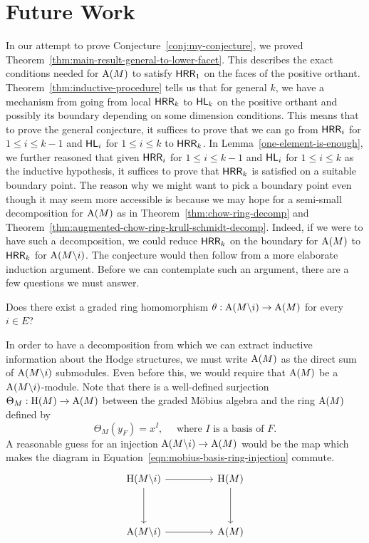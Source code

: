 \documentclass{puthesis-UG}
\begin{document}
\section{Future Work} \label{sec:future-work}

In our attempt to prove Conjecture~\ref{conj:my-conjecture}, we proved Theorem~\ref{thm:main-result-general-to-lower-facet}. This describes the exact conditions needed for $\operatorname{A}(M)$ to satisfy $\mathsf{HRR}_1$ on the faces of the positive orthant. Theorem~\ref{thm:inductive-procedure} tells us that for general $k$, we have a mechanism from going from local $\mathsf{HRR}_k$ to $\mathsf{HL}_k$ on the positive orthant and possibly its boundary depending on some dimension conditions. This means that to prove the general conjecture, it suffices to prove that we can go from $\mathsf{HRR}_i$ for $1 \leq i \leq k-1$ and $\mathsf{HL}_i$ for $1 \leq i \leq k$ to $\mathsf{HRR}_k$. In Lemma~\ref{one-element-is-enough}, we further reasoned that given $\mathsf{HRR}_i$ for $1 \leq i \leq k-1$ and $\mathsf{HL}_i$ for $1 \leq i \leq k$ as the inductive hypothesis, it suffices to prove that $\mathsf{HRR}_k$ is satisfied on a suitable boundary point. The reason why we might want to pick a boundary point even though it may seem more accessible is because we may hope for a semi-small decomposition for $\operatorname{A}(M)$ as in Theorem~\ref{thm:chow-ring-decomp} and Theorem~\ref{thm:augmented-chow-ring-krull-schmidt-decomp}. Indeed, if we were to have such a decomposition, we could reduce $\mathsf{HRR}_k$ on the boundary for $\operatorname{A}(M)$ to $\mathsf{HRR}_k$ for $\operatorname{A}(M \backslash i)$. The conjecture would then follow from a more elaborate induction argument. Before we can contemplate such an argument, there are a few questions we must answer. 
\begin{question}
	Does there exist a graded ring homomorphism $\theta : \operatorname{A}(M \backslash i) \to \operatorname{A}(M)$ for every $i \in E$? 
\end{question}
In order to have a decomposition from which we can extract inductive information about the Hodge structures, we must write $\operatorname{A}(M)$ as the direct sum of $\operatorname{A}(M \backslash i)$ submodules. Even before this, we would require that $\operatorname{A}(M)$ be a $\operatorname{A}(M \backslash i)$-module. Note that there is a well-defined surjection $\Theta_M : \operatorname{H}(M) \to \operatorname{A}(M)$ between the graded M\"obius algebra and the ring $\operatorname{A}(M)$ defined by 
\[
	\Theta_{M}(y_F) = x^I, \quad \text{ where $I$ is a basis of $F$}.
\]
A reasonable guess for an injection $\operatorname{A}(M \backslash i) \to \operatorname{A}(M)$ would be the map which makes the diagram in Equation~\ref{eqn:mobius-basis-ring-injection} commute. 
\begin{equation} \label{eqn:mobius-basis-ring-injection}
	\begin{tikzcd}
	{\operatorname{H}(M\backslash i)} && {\operatorname{H} (M)} \\
	\\
	{\operatorname{A}(M\backslash i)} && {\operatorname{A}(M)}
	\arrow[from=1-1, to=1-3]
	\arrow[from=1-3, to=3-3]
	\arrow[from=1-1, to=3-1]
	\arrow[from=3-1, to=3-3]
\end{tikzcd}
\end{equation}
\end{document}
